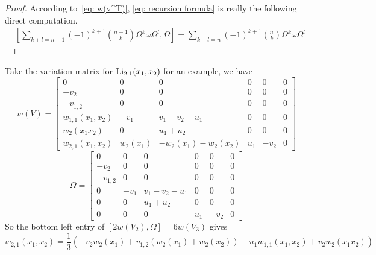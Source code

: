 \begin{proof}
According to~\eqref{eq: w(v^T)}, \eqref{eq: recursion formula} is really the following direct computation.
\begin{equation}
\begin{aligned}
&\left[\sum_{k+l=n-1}(-1)^{k+1}\binom{n-1}{k}\Omega^k\omega\Omega^l,\Omega\right]=\sum_{k+l=n}(-1)^{k+1}\binom{n}{k}\Omega^k\omega\Omega^l
\end{aligned}
\end{equation}
\end{proof}

\begin{example}
Take the variation matrix for $\operatorname{Li}_{2,1}(x_1,x_2)$ for an example, we have
\[
w(V)=\begin{bmatrix}
0&0&0&0&0&0\\
-v_2&0&0&0&0&0\\
-v_{1,2}&0&0&0&0&0\\
w_{1,1}(x_1,x_2)&-v_1&v_1-v_2-u_1&0&0&0\\
w_2(x_1x_2)&0&u_1+u_2&0&0&0\\
w_{2,1}(x_1,x_2)&w_2(x_1)&-w_2(x_1)-w_2(x_2)&u_1&-v_2&0
\end{bmatrix}
\]
\[
\Omega=\begin{bmatrix}
0&0&0&0&0&0\\
-v_2&0&0&0&0&0\\
-v_{1,2}&0&0&0&0&0\\
0&-v_1&v_1-v_2-u_1&0&0&0\\
0&0&u_1+u_2&0&0&0\\
0&0&0&u_1&-v_2&0
\end{bmatrix}
\]
So the bottom left entry of $[2w(V_2),\Omega]=6w(V_3)$ gives
\begin{equation}
w_{2,1}(x_1,x_2)=\frac{1}{3}\left(-v_2w_2(x_1)+v_{1,2}(w_2(x_1)+w_2(x_2))-u_1w_{1,1}(x_1,x_2)+v_2w_2(x_1x_2)\right)
\end{equation}
\end{example}